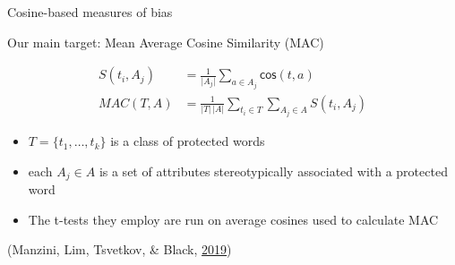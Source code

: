 \documentclass[10pt,ignorenonframetext,x11names, dvipsnames, bibspacing,natbib]{beamer}
\providecommand{\tightlist}{%
  \setlength{\itemsep}{0pt}\setlength{\parskip}{0pt}}
\begin{document}
\begin{frame}{Cosine-based measures of bias}
\protect\hypertarget{cosine-based-measures-of-bias-7}{}

\begin{block}{Our main target: Mean Average Cosine Similarity (MAC)}

\begin{align*}
S(t_i, A_j) & = \frac{1}{\vert A_j\vert}\sum_{a\in A_j}\mathsf{cos}(t,a) \\
MAC(T,A) & = \frac{1}{\vert T \vert \,\vert A\vert}\sum_{t_i \in T }\sum_{A_j \in A} S(t_i,A_j)
\end{align*}

\begin{itemize}
\item
  \(T = \{t_1, \dots, t_k\}\) is a class of protected words
\item
  each \(A_j\in A\) is a set of attributes stereotypically associated
  with a protected word
\end{itemize}

\begin{itemize}
\tightlist
\item
  The t-tests they employ are run on average cosines used to calculate
  MAC
\end{itemize}

\vspace{2mm}

\footnotesize

(Manzini, Lim, Tsvetkov, \& Black,
\protect\hyperlink{ref-Manzini2019blackToCriminal}{2019})

\end{block}

\end{frame}
\end{document}

